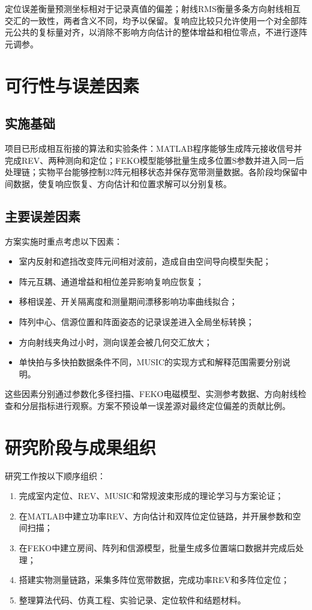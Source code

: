 \documentclass[UTF8,a4paper,12pt]{ctexart}
\begin{document}
定位误差衡量预测坐标相对于记录真值的偏差；射线RMS衡量多条方向射线相互交汇的一致性，两者含义不同，均予以保留。复响应比较只允许使用一个对全部阵元公共的复标量对齐，以消除不影响方向估计的整体增益和相位零点，不进行逐阵元调参。

\section{可行性与误差因素}

\subsection{实施基础}

项目已形成相互衔接的算法和实验条件：MATLAB程序能够生成阵元接收信号并完成REV、两种测向和定位；FEKO模型能够批量生成多位置S参数并进入同一后处理链；实物平台能够控制32阵元相移状态并保存宽带测量数据。各阶段均保留中间数据，使复响应恢复、方向估计和位置求解可以分别复核。

\subsection{主要误差因素}

方案实施时重点考虑以下因素：

\begin{itemize}
  \item 室内反射和遮挡改变阵元间相对波前，造成自由空间导向模型失配；
  \item 阵元互耦、通道增益和相位差异影响复响应恢复；
  \item 移相误差、开关隔离度和测量期间漂移影响功率曲线拟合；
  \item 阵列中心、信源位置和阵面姿态的记录误差进入全局坐标转换；
  \item 方向射线夹角过小时，测向误差会被几何交汇放大；
  \item 单快拍与多快拍数据条件不同，MUSIC的实现方式和解释范围需要分别说明。
\end{itemize}

这些因素分别通过参数化多径扫描、FEKO电磁模型、实测参考数据、方向射线检查和分层指标进行观察。方案不预设单一误差源对最终定位偏差的贡献比例。

\section{研究阶段与成果组织}

研究工作按以下顺序组织：

\begin{enumerate}
  \item 完成室内定位、REV、MUSIC和常规波束形成的理论学习与方案论证；
  \item 在MATLAB中建立功率REV、方向估计和双阵位定位链路，并开展参数和空间扫描；
  \item 在FEKO中建立房间、阵列和信源模型，批量生成多位置端口数据并完成后处理；
  \item 搭建实物测量链路，采集多阵位宽带数据，完成功率REV和多阵位定位；
  \item 整理算法代码、仿真工程、实验记录、定位软件和结题材料。
\end{enumerate}
\end{document}
